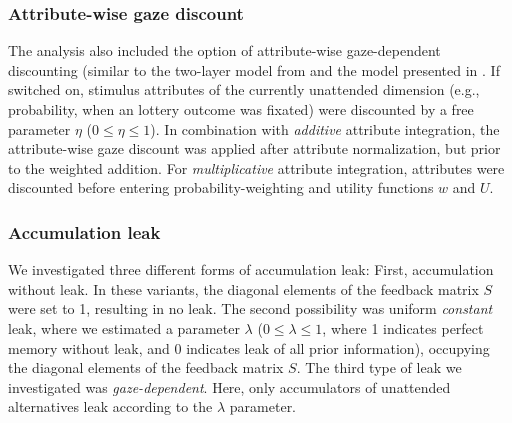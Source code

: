 \documentclass[11pt, a4paper]{article}
\begin{document}
\subsubsection*{Attribute-wise gaze discount}
The analysis also included the option of attribute-wise gaze-dependent discounting (similar to the two-layer model from \citeauthor{glickman2019FormationPreferenceRisky} \autocite{glickman2019FormationPreferenceRisky} and the model presented in \citeauthor{fisher2017AttentionalDriftDiffusion} \autocite{fisher2017AttentionalDriftDiffusion}. If switched on, stimulus attributes of the currently unattended dimension (e.g., probability, when an lottery outcome was fixated) were discounted by a free parameter $\eta$ ($0 \le \eta \le 1$). In combination with \emph{additive} attribute integration, the attribute-wise gaze discount was applied after attribute normalization, but prior to the weighted addition. For \emph{multiplicative} attribute integration, attributes were discounted before entering probability-weighting and utility functions $w$ and $U$.

\subsubsection*{Accumulation leak}
We investigated three different forms of accumulation leak: First, accumulation without leak. In these variants, the diagonal elements of the feedback matrix $S$ were set to 1, resulting in no leak. The second possibility was uniform \emph{constant} leak, where we estimated a parameter $\lambda$ ($0 \le \lambda \le 1$, where 1 indicates perfect memory without leak, and 0 indicates leak of all prior information), occupying the diagonal elements of the feedback matrix $S$.
The third type of leak we investigated was \emph{gaze-dependent}. Here, only accumulators of unattended alternatives leak according to the $\lambda$ parameter.
\end{document}
